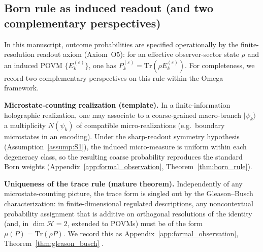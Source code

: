 \subsection{Born rule as induced readout (and two complementary perspectives)}
In this manuscript, outcome probabilities are specified operationally by the finite-resolution readout axiom (Axiom~O5): for an effective observer-sector state $\rho$ and an induced POVM $\{E_k^{(\varepsilon)}\}$, one has $P_k^{(\varepsilon)}=\mathrm{Tr}(\rho E_k^{(\varepsilon)})$. For completeness, we record two complementary perspectives on this rule within the Omega framework.\par
\noindent
\textbf{Microstate-counting realization (template).} In a finite-information holographic realization, one may associate to a coarse-grained macro-branch $|\psi_k\rangle$ a multiplicity $N(\psi_k)$ of compatible micro-realizations (e.g.\ boundary microstates in an encoding). Under the sharp-readout symmetry hypothesis (Assumption~\ref{assump:S1}), the induced micro-measure is uniform within each degeneracy class, so the resulting coarse probability reproduces the standard Born weights (Appendix~\ref{app:formal_observation}, Theorem~\ref{thm:born_rule}).\par
\noindent
\textbf{Uniqueness of the trace rule (mature theorem).} Independently of any microstate-counting picture, the trace form is singled out by the Gleason--Busch characterization: in finite-dimensional regulated descriptions, any noncontextual probability assignment that is additive on orthogonal resolutions of the identity (and, in $\dim\mathcal{H}=2$, extended to POVMs) must be of the form $\mu(P)=\mathrm{Tr}(\rho P)$. We record this as Appendix~\ref{app:formal_observation}, Theorem~\ref{thm:gleason_busch} \cite{Gleason1957,Busch2003}.


